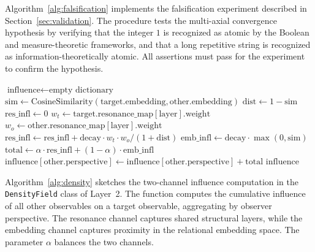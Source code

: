 Algorithm~\ref{alg:falsification} implements the falsification experiment described in Section~\ref{sec:validation}. The procedure tests the multi-axial convergence hypothesis by verifying that the integer $1$ is recognized as atomic by the Boolean and measure-theoretic frameworks, and that a long repetitive string is recognized as information-theoretically atomic. All assertions must pass for the experiment to confirm the hypothesis.

\begin{algorithm}[H]
\caption{Relational Influence Computation (DensityField)}
\label{alg:density}
\begin{algorithmic}[1]
    \State $\text{influence} \gets \text{empty dictionary}$
        \State $\text{sim} \gets \text{CosineSimilarity}(\text{target}.\text{embedding}, \text{other}.\text{embedding})$
        \State $\text{dist} \gets 1 - \text{sim}$
        \State $\text{res\_infl} \gets 0$
            \State $w_t \gets \text{target}.\text{resonance\_map}[\text{layer}].\text{weight}$
            \State $w_o \gets \text{other}.\text{resonance\_map}[\text{layer}].\text{weight}$
            \State $\text{res\_infl} \gets \text{res\_infl} + \text{decay} \cdot w_t \cdot w_o / (1 + \text{dist})$
        \EndFor
        \State $\text{emb\_infl} \gets \text{decay} \cdot \max(0, \text{sim})$
        \State $\text{total} \gets \alpha \cdot \text{res\_infl} + (1-\alpha) \cdot \text{emb\_infl}$
        \State $\text{influence}[\text{other}.\text{perspective}] \gets \text{influence}[\text{other}.\text{perspective}] + \text{total}$
    \EndFor
    \State \Return $\text{influence}$
\EndFunction
\end{algorithmic}
\end{algorithm}

Algorithm~\ref{alg:density} sketches the two-channel influence computation in the \texttt{DensityField} class of Layer~2. The function computes the cumulative influence of all other observables on a target observable, aggregating by observer perspective. The resonance channel captures shared structural layers, while the embedding channel captures proximity in the relational embedding space. The parameter $\alpha$ balances the two channels.